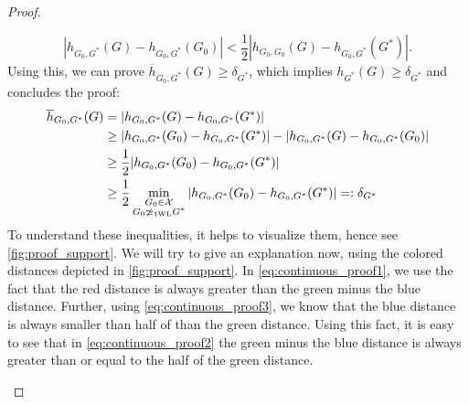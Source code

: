 \begin{proof}
\begin{enumerate}
\begin{equation}
             |h_{G_0, G^*}(G) - h_{G_0, G^*}(G_0)| < \frac{1}{2}|h_{G_0, G_0}(G) - h_{G_0, G^*}(G^*)|.
        \end{equation}
        Using this, we can prove $\overline{h}_{G_0, G^*}(G) \geq \delta_{G^*}$, which implies $h_{G^*}(G) \geq \delta_{G^*}$ and concludes the proof:
        \begin{align}
            \overline{h}_{G_0, G^*}(G) &= |h_{G_0, G^*}(G) - h_{G_0, G^*}(G^*)| \nonumber \\
            &\geq |h_{G_0, G^*}(G_0) - h_{G_0, G^*}(G^*)| - |h_{G_0, G^*}(G) - h_{G_0, G^*}(G_0)|\label{eq:continuous_proof1}\\
            &\geq \frac{1}{2} |h_{G_0, G^*}(G_0) - h_{G_0, G^*}(G^*)|\label{eq:continuous_proof2}\\
            &\geq \frac{1}{2} \min_{\substack{G_0 \in \mathcal{X}\\G_0 \not\simeq_{\text{1WL}} G^*}} |h_{G_0, G^*}(G_0) - h_{G_0, G^*}(G^*)| =: \delta_{G^*} \nonumber
        \end{align}
        To understand these inequalities, it helps to visualize them, hence see \cref{fig:proof_support}. We will try to give an explanation now, using the colored distances depicted in \cref{fig:proof_support}. In \cref{eq:continuous_proof1}, we use the fact that the red distance is always greater than the green minus the blue distance. Further, using \cref{eq:continuous_proof3}, we know that the blue distance is always smaller than half of than the green distance. Using this fact, it is easy to see that in \cref{eq:continuous_proof2} the green minus the blue distance is always greater than or equal to the half of the green distance.


\end{enumerate}
\end{proof}
